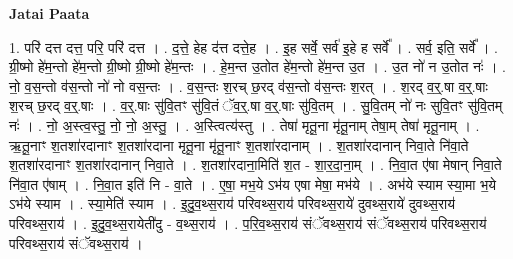 \documentclass[17pt]{extarticle}
\begin{document}
\textbf{Jatai Paata} \newline

1. परि॑ दत्त दत्त॒ परि॒ परि॑ दत्त । . द॒त्ते॒ हेह द॑त्त दत्ते॒ह । . इ॒ह सर्वे॒ सर्व॑ इ॒हे ह सर्वे᳚ । . सर्व॒ इति॒ सर्वे᳚ । . ग्री॒ष्मो हे॑म॒न्तो हे॑म॒न्तो ग्री॒ष्मो ग्री॒ष्मो हे॑म॒न्तः । . हे॒म॒न्त उ॒तोत हे॑म॒न्तो हे॑म॒न्त उ॒त । . उ॒त नो॑ न उ॒तोत नः॑ । . नो॒ व॒स॒न्तो व॑स॒न्तो नो॑ नो वस॒न्तः । . व॒स॒न्तः श॒रच् छ॒रद् व॑स॒न्तो व॑स॒न्तः श॒रत् । . श॒रद् व॒र्॒.षा व॒र्॒.षाः श॒रच् छ॒रद् व॒र्॒.षाः । . व॒र्॒.षाः सु॑वि॒तꣳ सु॑वि॒तं ॅव॒र्॒.षा व॒र्॒.षाः सु॑वि॒तम् । . सु॒वि॒तम् नो॑ नः सुवि॒तꣳ सु॑वि॒तम् नः॑ । . नो॒ अ॒स्त्व॒स्तु॒ नो॒ नो॒ अ॒स्तु॒ । . अ॒स्त्वित्य॑स्तु । . तेषा॑ मृतू॒ना मृ॑तू॒नाम् तेषा॒म् तेषा॑ मृतू॒नाम् । . ऋ॒तू॒नाꣳ श॒तशा॑रदानाꣳ श॒तशा॑रदाना मृतू॒ना मृ॑तू॒नाꣳ श॒तशा॑रदानाम् । . श॒तशा॑रदानान् निवा॒ते नि॑वा॒ते श॒तशा॑रदानाꣳ श॒तशा॑रदानान् निवा॒ते । . श॒तशा॑रदाना॒मिति॑ श॒त - शा॒र॒दा॒ना॒म् । . नि॒वा॒त ए॑षा मेषान् निवा॒ते नि॑वा॒त ए॑षाम् । . नि॒वा॒त इति॑ नि - वा॒ते । . ए॒षा॒ मभ॒ये ऽभ॑य एषा मेषा॒ मभ॑ये । . अभ॑ये स्याम स्या॒मा भ॒ये ऽभ॑ये स्याम । . स्या॒मेति॑ स्याम । . इ॒दु॒व॒थ्स॒राय॑ परिवथ्स॒राय॑ परिवथ्स॒राये॑ दुवथ्स॒राये॑ दुवथ्स॒राय॑ परिवथ्स॒राय॑ । . इ॒दु॒व॒थ्स॒रायेती॑दु - व॒थ्स॒राय॑ । . प॒रि॒व॒थ्स॒राय॑ संॅवथ्स॒राय॑ संॅवथ्स॒राय॑ परिवथ्स॒राय॑ परिवथ्स॒राय॑ संॅवथ्स॒राय॑ । \newline
\end{document}
